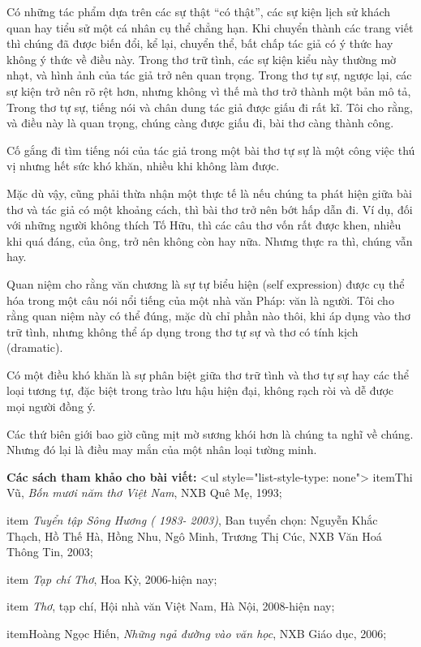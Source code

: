 \documentclass[../main.tex]{subfiles}
\begin{document}
\begin{multicols}{2}
Có những tác phẩm dựa trên các sự thật “có thật”, các sự kiện lịch sử khách quan hay tiểu sử một cá nhân cụ thể chẳng hạn. Khi chuyển thành các trang viết thì chúng đã được biến đổi, kể lại, chuyển thể, bất chấp tác giả có ý thức hay không ý thức về điều này. Trong thơ trữ tình, các sự kiện kiểu này thường mờ nhạt, và hình ảnh của tác giả trở nên quan trọng. Trong thơ tự sự, ngược lại, các sự kiện trở nên rõ rệt hơn, nhưng không vì thế mà thơ trở thành một bản mô tả, Trong thơ tự sự, tiếng nói và chân dung tác giả được giấu đi rất kĩ. Tôi cho rằng, và điều này là quan trọng, chúng càng được giấu đi, bài thơ càng thành công. 

Cố gắng đi tìm tiếng nói của tác giả trong một bài thơ tự sự là một công việc thú vị nhưng hết sức khó khăn, nhiều khi không làm được. 

Mặc dù vậy, cũng phải thừa nhận một thực tế là nếu chúng ta phát hiện giữa bài thơ và tác giả có một khoảng cách, thì bài thơ trở nên bớt hấp dẫn đi. Ví dụ, đối với những người không thích Tố Hữu, thì các câu thơ vốn rất được khen, nhiều khi quá đáng, của ông, trở nên không còn hay nữa. Nhưng thực ra thì, chúng vẫn hay. 

Quan niệm cho rằng văn chương là sự tự biểu hiện (self expression) được cụ thể hóa trong một câu nói nổi tiếng của một nhà văn Pháp: văn là người. Tôi cho rằng quan niệm này có thể đúng, mặc dù chỉ phần nào thôi, khi áp dụng vào thơ trữ tình, nhưng không thể áp dụng trong thơ tự sự và thơ có tính kịch (dramatic). 

Có một điều khó khăn là sự phân biệt giữa thơ trữ tình và thơ tự sự hay các thể loại tương tự, đặc biệt trong trào lưu hậu hiện đại, không rạch ròi và dễ được mọi người đồng ý. 

Các thứ biên giới bao giờ cũng mịt mờ sương khói hơn là chúng ta nghĩ về chúng. Nhưng đó lại là điều may mắn của một nhân loại tường minh. 


\textbf{Các sách tham khảo cho bài viết:} 
<ul style="list-style-type: none">
item{Thi Vũ, \textit{Bốn mươi năm thơ Việt Nam}, NXB Quê Mẹ, 1993; }

item{
\textit{Tuyển tập Sông Hương ( 1983- 2003)}, Ban tuyển chọn: Nguyễn Khắc Thạch, Hồ Thế Hà, Hồng Nhu, Ngô Minh, Trương Thị Cúc, NXB Văn Hoá Thông Tin, 2003; }

item{
\textit{Tạp chí Thơ}, Hoa Kỳ, 2006-hiện nay; }

item{
\textit{Thơ}, tạp chí, Hội nhà văn Việt Nam, Hà Nội, 2008-hiện nay; }

item{Hoàng Ngọc Hiến, \textit{Những ngả đường vào văn học}, NXB Giáo dục, 2006; }


\end{multicols}
\end{document}

